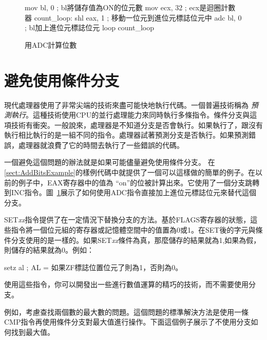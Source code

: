 \begin{figure}[t]
\begin{AsmCodeListing}
      mov    bl, 0           ; bl將儲存值為ON的位元數
      mov    ecx, 32         ; ecx是迴圈計數器
count_loop:
      shl    eax, 1          ; 移動一位元到進位元標誌位元中
      adc    bl, 0           ; bl加上進位元標誌位元
      loop   count_loop
\end{AsmCodeListing}
\caption{用{\code ADC}計算位數 \label{fig:countBitsAdc}}
\end{figure}

\section{避免使用條件分支}

現代處理器使用了非常尖端的技術來盡可能快地執行代碼。一個普遍技術稱為
\emph{預測執行}。這種技術使用CPU的並行處理能力來同時執行多條指令。條件分支與這項技術有衝突。一般說來，處理器是不知道分支是否會執行。如果執行了，跟沒有執行相比執行的是一組不同的指令。處理器試著預測分支是否執行。如果預測錯誤，處理器就浪費了它的時間去執行了一些錯誤的代碼。


一個避免這個問題的辦法就是如果可能儘量避免使用條件分支。 在\ref{sect:AddBitsExample}的樣例代碼中就提供了一個可以這樣做的簡單的例子。在以前的例子中，EAX寄存器中的值為
``on''的位被計算出來。它使用了一個分支跳轉到{\code INC}指令。圖~\ref{fig:countBitsAdc}展示了如何使用{\code ADC}指令直接加上進位元標誌位元來替代這個分支。

{\code SET\emph{xx}}指令提供了在一定情況下替換分支的方法。基於FLAGS寄存器的狀態，這些指令將一個位元組的寄存器或記憶體空間中的值置為0或1。在{\code SET}後的字元與條件分支使用的是一樣的。如果{\code SET\emph{xx}}條件為真，那麼儲存的結果就為1,如果為假，則儲存的結果就為0。例如：
\begin{AsmCodeListing}[frame=none,numbers=none]
      setz   al        ; AL = 如果ZF標誌位置位元了則為1，否則為0。
\end{AsmCodeListing}
使用這些指令，你可以開發出一些進行數值運算的精巧的技術，而不需要使用分支。

例如，考慮查找兩個數的最大數的問題。這個問題的標準解決方法是使用一條{\code CMP}指令再使用條件分支對最大值進行操作。下面這個例子展示了不使用分支如何找到最大值。

